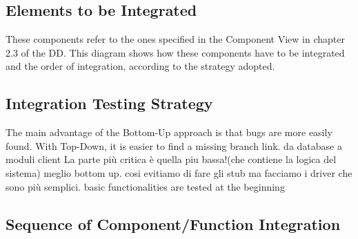 \documentclass[18pt,oneside,a4paper, titlepage]{article}
\begin{document}
	\subsection{Elements to	be Integrated}
		These components refer to the ones specified in the Component View in chapter 2.3 of the DD. This diagram shows how these components have to be integrated and the order of integration, according to the strategy adopted.
	\subsection{Integration Testing Strategy}
		The main advantage of the Bottom-Up approach is that bugs are more easily found. With Top-Down, it is easier to find a missing branch link.
		da database a moduli client
		La parte più critica è quella piu bassa!(che contiene la logica del sistema) meglio bottom up.
		cosi evitiamo di fare gli stub ma facciamo i driver che sono più semplici.
		basic functionalities are tested at the beginning
	\subsection{Sequence of	Component/Function Integration}
\end{document}
